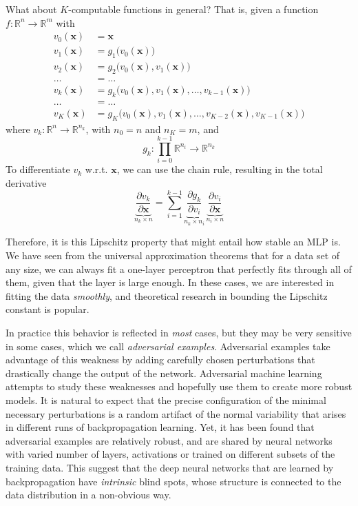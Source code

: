   What about $K$-computable functions in general? That is, given a function $f: \mathbb{R}^n \longrightarrow \mathbb{R}^m$ with 
  \begin{align}
    v_0 (\mathbf{x}) & = \mathbf{x} \\ 
    v_1 (\mathbf{x}) & = g_1 \big(v_0(\mathbf{x}) \big) \\
    v_2 (\mathbf{x}) & = g_2 \big(v_0(\mathbf{x}), v_1 (\mathbf{x}) \big) \\ 
    \ldots & = \ldots \\
    v_k (\mathbf{x}) & = g_k \big(v_0 (\mathbf{x}), v_1(\mathbf{x}), \ldots, v_{k-1} (\mathbf{x}) \big) \\
    \ldots & = \ldots \\
    v_K (\mathbf{x}) & = g_K \big(v_0(\mathbf{x}), v_1 (\mathbf{x}), \ldots, v_{K-2}(\mathbf{x}), v_{K-1}(\mathbf{x}) \big)
  \end{align}
  where $v_k: \mathbb{R}^n \longrightarrow \mathbb{R}^{n_k}$, with $n_0 = n$ and $n_K = m$, and 
  \begin{equation}
    g_k : \prod_{i=0}^{k-1} \mathbb{R}^{n_i} \longrightarrow \mathbb{R}^{n_k}
  \end{equation}
  To differentiate $v_k$ w.r.t. $\mathbf{x}$, we can use the chain rule, resulting in the total derivative 
  \begin{equation}
    \underbrace{\frac{\partial v_k}{\partial \mathbf{x}}}_{n_k \times n} = \sum_{i=1}^{k-1} \underbrace{\frac{\partial g_k}{\partial v_i}}_{n_k \times n_i} \, \underbrace{\frac{\partial v_i}{\partial \mathbf{x}}}_{n_i \times n}
  \end{equation}

  Therefore, it is this Lipschitz property that might entail how stable an MLP is. We have seen from the universal approximation theorems that for a data set of any size, we can always fit a one-layer perceptron that perfectly fits through all of them, given that the layer is large enough. In these cases, we are interested in fitting the data \textit{smoothly}, and theoretical research in bounding the Lipschitz constant is popular.

  In practice this behavior is reflected in \textit{most} cases, but they may be very sensitive in some cases, which we call \textit{adversarial examples}. Adversarial examples take advantage of this weakness by adding carefully chosen perturbations that drastically change the output of the network. Adversarial machine learning attempts to study these weaknesses and hopefully use them to create more robust models. It is natural to expect that the precise configuration of the minimal necessary perturbations is a random artifact of the normal variability that arises in different runs of backpropagation learning. Yet, it has been found that adversarial examples are relatively robust, and are shared by neural networks with varied number of layers, activations or trained on different subsets of the training data. This suggest that the deep neural networks that are learned by backpropagation have \textit{intrinsic} blind spots, whose structure is connected to the data distribution in a non-obvious way. 

